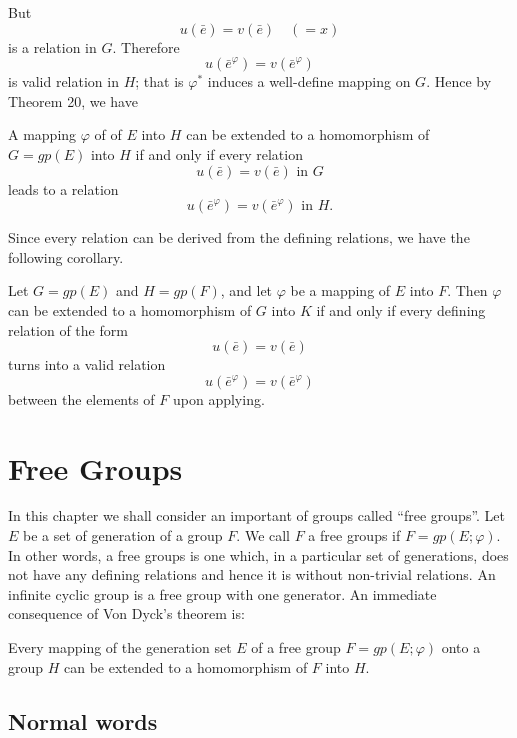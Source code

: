 But
$$
u(\bar{e})=v(\bar{e}) \quad(=x)
$$
is a relation in $G$. Therefore
$$
u(\bar{e}^\varphi)=v(\bar{e}^\varphi) 
$$
is valid relation in $H$; that is $\varphi^*$ induces a well-define
mapping on $G$. Hence by Theorem 20, we have 
\begin{Theorem} %
  A mapping $\varphi$ of of $E$ into $H$ can be extended to a
  homomorphism of $G=gp(E)$ into $H$ if and only if every relation 
  $$
  u(\bar{e})=v(\bar{e}) \text{ in } G
  $$
  leads to a relation
  $$
  u(\bar{e}^\varphi)=v(\bar{e}^\varphi) \text{ in } H.
  $$

  Since every relation can be derived from the defining relations, we
  have the following corollary. 
\end{Theorem}

\begin{corollary} 
  Let $G=gp(E)$ and $H=gp(F)$, and let $\varphi$ be a mapping of $E$
  into $F$. Then $\varphi$ can be extended to a homomorphism of $G$
  into $K$ if and only if every defining relation of the form 
  $$
  u(\bar{e})=v(\bar{e})
  $$
  turns into a valid relation
  $$
  u(\bar{e}^\varphi)= v(\bar{e}^\varphi)
  $$
  between the elements of $F$ upon applying.
\end{corollary}

\chapter{Free Groups} %

In this chapter we shall consider an important of groups called ``free
groups''. Let $E$ be a set of generation of a group $F$. We call $F$ a
free groups if $F=gp(E; \varphi)$. In other words, a free groups is
one which, in a particular set of generations, does not have any
defining relations and hence it is without non-trivial relations. An
infinite cyclic group is a free group with one generator. An immediate
consequence of Von Dyck's theorem is: 

\setcounter{Theorem}{0}
\begin{Theorem} %
  Every mapping of the generation set $E$ of a free group $F=gp(E;
  \varphi)$ onto a group $H$ can be extended to a homomorphism of $F$
  into $H$. 
\end{Theorem}

\section{Normal words} %

